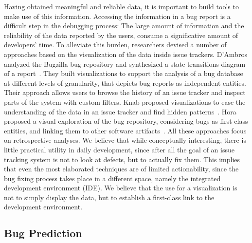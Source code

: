 Having obtained meaningful and reliable data, it is important to build tools to make use of this information. Accessing the information in a bug report is a difficult step in the debugging process: The large amount of information and the reliability of the data reported by the users, consume a significative amount of developers' time. To alleviate this burden, researchers devised a number of approaches based on the visualization of the data inside issue trackers. D'Ambros \etal analyzed the Bugzilla bug repository and synthesized a state transitions diagram of a report~\cite{DAmb2007b}. They built visualizations to support the analysis of a bug database at different levels of granularity, that depicts bug reports as independent entities. Their approach allows users to browse the history of an issue tracker and inspect parts of the system with custom filters. Knab \etal proposed visualizations to ease the understanding of the data in an issue tracker and find hidden patterns~\cite{Knab2009a,Knab2010a}. Hora \etal proposed a visual exploration of the bug repository, considering bugs as first class entities, and linking them to other software artifacts~\cite{Hora2012a}. All these approaches focus on retrospective analyses. We believe that while conceptually interesting, there is little practical utility in daily development, since after all the goal of an issue tracking system is not to look at defects, but to actually fix them. This implies that even the most elaborated techniques are of limited actionability, since the bug fixing process takes place in a different space, namely the integrated development environment (IDE). We believe that the use for a visualization is not to simply display the data, but to establish a first-class link to the development environment.


\subsection{Bug Prediction}

